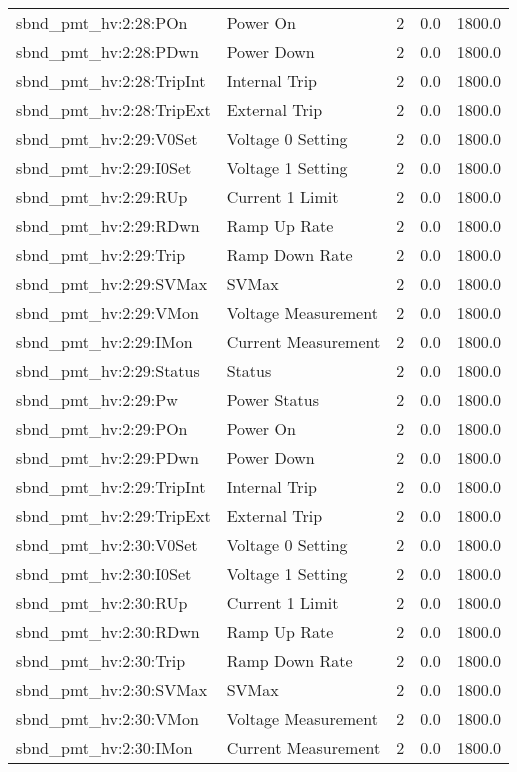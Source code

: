 \begin{center}
\begin{longtable}{l | l l l l }
sbnd\_pmt\_hv:2:28:POn & Power On & 2 & 0.0 & 1800.0\\ 
sbnd\_pmt\_hv:2:28:PDwn & Power Down & 2 & 0.0 & 1800.0\\ 
sbnd\_pmt\_hv:2:28:TripInt & Internal Trip & 2 & 0.0 & 1800.0\\ 
sbnd\_pmt\_hv:2:28:TripExt & External Trip & 2 & 0.0 & 1800.0\\ 
sbnd\_pmt\_hv:2:29:V0Set & Voltage 0 Setting & 2 & 0.0 & 1800.0\\ 
sbnd\_pmt\_hv:2:29:I0Set & Voltage 1 Setting & 2 & 0.0 & 1800.0\\ 
sbnd\_pmt\_hv:2:29:RUp & Current 1 Limit & 2 & 0.0 & 1800.0\\ 
sbnd\_pmt\_hv:2:29:RDwn & Ramp Up Rate & 2 & 0.0 & 1800.0\\ 
sbnd\_pmt\_hv:2:29:Trip & Ramp Down Rate & 2 & 0.0 & 1800.0\\ 
sbnd\_pmt\_hv:2:29:SVMax & SVMax & 2 & 0.0 & 1800.0\\ 
sbnd\_pmt\_hv:2:29:VMon & Voltage Measurement & 2 & 0.0 & 1800.0\\ 
sbnd\_pmt\_hv:2:29:IMon & Current Measurement & 2 & 0.0 & 1800.0\\ 
sbnd\_pmt\_hv:2:29:Status & Status & 2 & 0.0 & 1800.0\\ 
sbnd\_pmt\_hv:2:29:Pw & Power Status & 2 & 0.0 & 1800.0\\ 
sbnd\_pmt\_hv:2:29:POn & Power On & 2 & 0.0 & 1800.0\\ 
sbnd\_pmt\_hv:2:29:PDwn & Power Down & 2 & 0.0 & 1800.0\\ 
sbnd\_pmt\_hv:2:29:TripInt & Internal Trip & 2 & 0.0 & 1800.0\\ 
sbnd\_pmt\_hv:2:29:TripExt & External Trip & 2 & 0.0 & 1800.0\\ 
sbnd\_pmt\_hv:2:30:V0Set & Voltage 0 Setting & 2 & 0.0 & 1800.0\\ 
sbnd\_pmt\_hv:2:30:I0Set & Voltage 1 Setting & 2 & 0.0 & 1800.0\\ 
sbnd\_pmt\_hv:2:30:RUp & Current 1 Limit & 2 & 0.0 & 1800.0\\ 
sbnd\_pmt\_hv:2:30:RDwn & Ramp Up Rate & 2 & 0.0 & 1800.0\\ 
sbnd\_pmt\_hv:2:30:Trip & Ramp Down Rate & 2 & 0.0 & 1800.0\\ 
sbnd\_pmt\_hv:2:30:SVMax & SVMax & 2 & 0.0 & 1800.0\\ 
sbnd\_pmt\_hv:2:30:VMon & Voltage Measurement & 2 & 0.0 & 1800.0\\ 
sbnd\_pmt\_hv:2:30:IMon & Current Measurement & 2 & 0.0 & 1800.0\\ 

\end{longtable}
\end{center}
